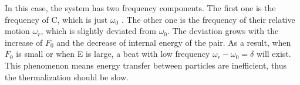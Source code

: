 \documentclass[aps,preprintnumbers,onecolumn,amsmath,amssymb,floatfix,pra]{revtex4-1}
\begin{document}
In this case, the system has two frequency components. The first one is the frequency of C, which is just $\omega_0$ . The other one is the frequency of their relative motion $\omega_r$, which is slightly deviated from $\omega_0$. The deviation grows with the increase of $F_0$ and the decrease of internal energy of the pair. As a result, when $F_0$ is small or when E is large, a beat with low frequency $\omega_r-\omega_0=\delta$ will exist. This phenomenon means energy transfer between particles are inefficient, thus the thermalization should be slow. 



\begin{figure}[h]

\end{figure}
\end{document}
